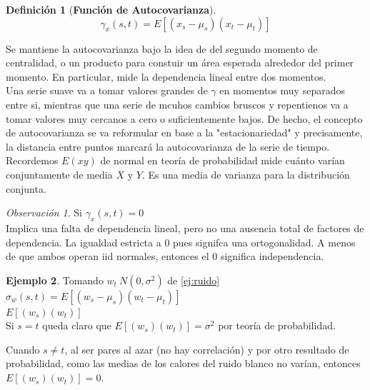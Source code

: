 \documentclass[11pt,a4paper,oneside]{report}
\theoremstyle{definition}
\newtheorem{definicion}{Definición}[chapter]
\newtheorem{ejemplo}[definicion]{Ejemplo}
\theoremstyle{plain}
\theoremstyle{remark}
\newtheorem*{observacion}{Observación}
\newcommand{\termino}[1]{\textbf{#1}\index{#1}}
\begin{document}
\begin{definicion}[\termino{Función de Autocovarianza}]
  \[\gamma_x(s,t)=E[(x_s-\mu_s)(x_t-\mu_t)] \]
\end{definicion}
Se mantiene la autocovarianza bajo la idea de del segundo momento de centralidad, o un producto para constuir
un área esperada alrededor del primer momento. En particular, mide la dependencia lineal entre dos momentos.\\
Una serie suave va a tomar valores grandes de $\gamma$ en momentos muy separados entre si, mientras que una serie
de mcuhos cambios bruscos y repentienos va a tomar valores muy cercanos a cero o suficientemente bajos. De hecho, el concepto
de autocovarianza se va reformular en base a la "estacionariedad" y precisamente, la distancia entre puntos marcará
la autocovarianza de la serie de tiempo.\\
Recordemos $E(xy)$ de normal en teoría de probabilidad mide cuánto varían conjuntamente de media $X$ y $Y$. Es una media
de varianza para la distribución conjunta.\\
\begin{observacion}
  Si $\gamma_x(s,t)=0$\\
  Implica una falta de dependencia lineal, pero no una ausencia total de factores de dependencia.
  La igualdad estricta a 0 pues signifca una ortogonalidad. A menos de que ambos operan iid normales,
  entonces el 0 significa independencia.
\end{observacion}

\begin{ejemplo}
  Tomando $w_t~N(0,\sigma^2)$ de \cref{ej:ruido}\\
  $\sigma_w(s,t)=E[(w_s-\mu_s)(w_t-\mu_t)]$\\
  $E[(w_s)(w_t)]$\\
  Si $s=t$ queda claro que $E[(w_s)(w_t)]=\sigma^2$ por teoría de probabilidad.
\end{ejemplo}
Cuando $s\not =t$, al ser pares al azar (no hay correlación) y por otro resultado de probabilidad, 
como las medias de los calores del ruido blanco no varían, entonces $E[(w_s)(w_t)]=0$.
\end{document}

